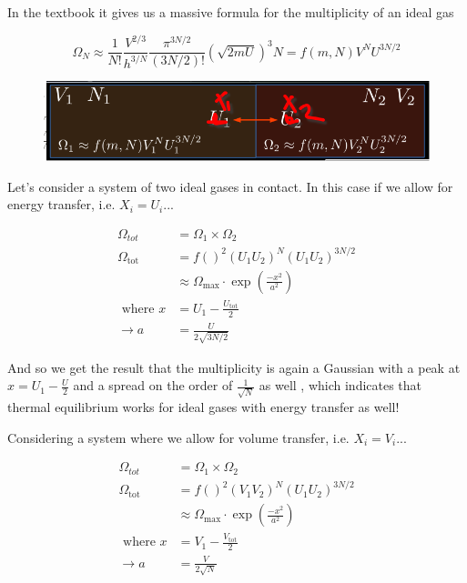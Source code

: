 \documentclass[10pt]{article}
\begin{document}
In the textbook it gives us a massive formula for the multiplicity of an ideal gas

\begin{equation}
	\Omega_N \approx \frac{1}{N!}\frac{V^{2/3}}{h^{3/N}} \frac{\pi^{3N/2}}{(3N/2)!}(\sqrt{2mU})^3N = f(m, N)V^NU^{3N/2}
	\label{eq:294:ideal_gas_multiplicity}
\end{equation}



\begin{figure}[H]
	\centering
	\includegraphics[width=0.8\linewidth]{img/294_equib_ex.png}
\end{figure}

Let's consider a system of two ideal gases in contact. 
In this case if we allow for energy transfer, i.e. $ X_i = U_i $...

\begin{equation}
	\begin{split}
		\Omega_{tot} &= \Omega_1 \times \Omega_2 \\
		\Omega_{\text{tot}} &= f()^2 (U_1U_2)^N(U_1U_2)^{3N/2}\\
												&\approx \Omega_{\text{max}} \cdot \exp \left(\frac{-x^2}{a^2}\right)\\
		\text{ where } x & = U_1 - \frac{U_{\text{tot}}}{2}\\
		\rightarrow a &= \frac{U}{2\sqrt{3N/2}}
	\end{split}
\end{equation}

And so we get the result that the multiplicity is again a Gaussian with a peak at $ x = U_1 - \frac{U}{2} $ and a spread on the order of $ \frac{1}{\sqrt{N} } $ as well , which indicates that thermal equilibrium works for ideal gases with energy transfer as well!



Considering a system where we allow for volume transfer, i.e. $ X_i = V_i $...

\begin{equation}
	\begin{split}
		\Omega_{tot} &= \Omega_1 \times \Omega_2 \\
		\Omega_{\text{tot}} &= f()^2 (V_1V_2)^N(U_1U_2)^{3N/2}\\
												&\approx \Omega_{\text{max}} \cdot \exp \left(\frac{-x^2}{a^2}\right)\\
		\text{ where } x & = V_1 - \frac{V_{\text{tot}}}{2}\\
		\rightarrow a &= \frac{V}{2\sqrt{N}}
	\end{split}
\end{equation}
\end{document}
